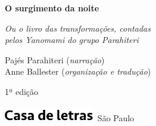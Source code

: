 




\begingroup\thispagestyle{empty}\vspace*{.05\textheight} 

              {\formular
              \huge
              \noindent
              \textbf{O surgimento da noite}\\
              
              \vspace{-0.5cm}
              
              }

              \vspace{0.5cm}

              \noindent{}\textit{Ou o livro das transformações, contadas\\pelos Yanomami do  grupo Parahiteri}
              
              \vfill              

              {\small
              \noindent{}Pajés Parahiteri (\textit{narração})\vspace{0.2cm}\\
              \noindent{}Anne Ballester (\textit{organização e tradução})
              }


              \vspace{0.5cm}

              {\small\noindent{}1ª edição}

              \vfill\noindent\includegraphics[width=0.3\textwidth]{LOGO_CDL.png}
              \break{} 
              \smallskip
              {\fontsize{30}{40}%
              \scriptsize\noindent São Paulo\quad\the\year}

\endgroup
\pagebreak
